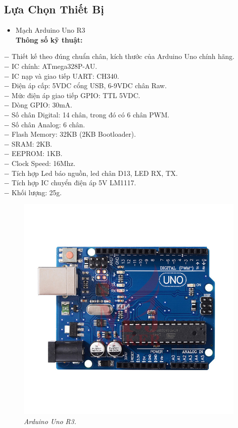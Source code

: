 \documentclass[12pt,a4paper]{article}
\begin{document}
\subsection{Lựa Chọn Thiết Bị}
\begin{itemize}
    \item Mạch Arduino Uno R3\\
    \textbf{Thông số kỹ thuật:}
\end{itemize}
$-$ Thiết kế theo đúng chuẩn chân, kích thước của Arduino Uno chính hãng.\\
$-$ IC chính: ATmega328P-AU.\\
$-$ IC nạp và giao tiếp UART: CH340.\\
$-$ Điện áp cấp: 5VDC cổng USB, 6-9VDC chân Raw.\\
$-$ Mức điện áp giao tiếp GPIO: TTL 5VDC.\\
$-$ Dòng GPIO: 30mA.\\
$-$ Số chân Digital: 14 chân, trong đó có 6 chân PWM.\\
$-$ Số chân Analog: 6 chân.\\
$-$ Flash Memory: 32KB (2KB Bootloader).\\
$-$ SRAM: 2KB.\\
$-$ EEPROM: 1KB.\\
$-$ Clock Speed: 16Mhz.\\
$-$ Tích hợp Led báo nguồn, led chân D13, LED RX, TX.\\
$-$ Tích hợp IC chuyển điện áp 5V LM1117.\\
$-$ Khối lượng: 25g.
\begin{figure}[ht!]
    \centering
    \includegraphics[scale=0.3]{hinh 2.jpg}
    \caption{\textit{Arduino Uno R3.}}
    \label{fig2}
\end{figure}
\end{document}
